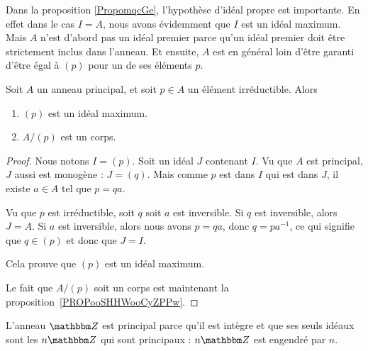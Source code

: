 \begin{normaltext}
    Dans la proposition \ref{PropomqcGe}, l'hypothèse d'idéal propre est importante. En effet dans le cas \( I=A\), nous avons évidemment que \( I\) est un idéal maximum. Mais \( A\) n'est d'abord pas un idéal premier parce qu'un idéal premier doit être strictement inclus dans l'anneau. Et ensuite, \( A\) est en général loin d'être garanti d'être égal à \( (p)\) pour un de ses éléments \( p\).
\end{normaltext}

\begin{proposition}     \label{PropoTMMXCx}
    Soit \( A \) un anneau principal, et soit \( p \in A \) un élément irréductible. Alors
    \begin{enumerate}
        \item
            \( (p)\) est un idéal maximum.
        \item       \label{ITEMooKPJQooWuPZXS}
            \( A/(p)\) est un corps.
    \end{enumerate}
\end{proposition}

\begin{proof}
    Nous notons \( I=(p)\). Soit un idéal \( J\) contenant \( I\). Vu que \( A\) est principal, \( J\) aussi est monogène : \( J=(q)\). Mais comme \( p\) est dans \( I\) qui est dans \( J\), il existe \( a\in A\) tel que \( p=qa\).

    Vu que \( p\) est irréductible, soit \( q\) soit \( a\) est inversible. Si \( q\) est inversible, alors \( J=A\). Si \( a\) est inversible, alors nous avons \( p=qa\), donc \( q=pa^{-1}\), ce qui signifie que \( q\in(p)\) et donc que \( J=I\).

    Cela prouve que \( (p)\) est un idéal maximum.

    Le fait que \( A/(p)\) soit un corps est maintenant la proposition~\ref{PROPooSHHWooCyZPPw}.
\end{proof}

\begin{example}
    L'anneau \( \eZ\) est principal parce qu'il est intègre et que ses seuls idéaux sont les \( n\eZ\) qui sont principaux : \( n\eZ\) est engendré par \( n\).
\end{example}

